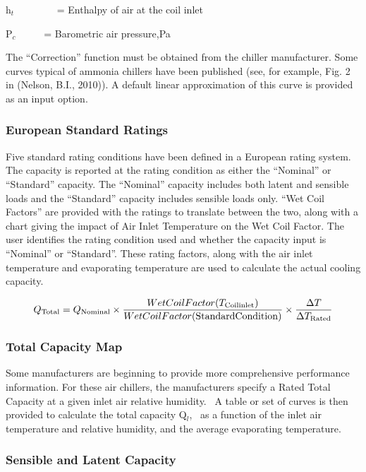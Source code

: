 h\(_{t}\)~~~~~~~~ = Enthalpy of air at the coil inlet

P\(_{c}\)~~~~~ = Barometric air pressure,Pa

The ``Correction'' function must be obtained from the chiller manufacturer. Some curves typical of ammonia chillers have been published (see, for example, Fig. 2 in (Nelson, B.I., 2010)). A default linear approximation of this curve is provided as an input option.

\subsubsection{European Standard Ratings}\label{european-standard-ratings}

Five standard rating conditions have been defined in a European rating system. The capacity is reported at the rating condition as either the ``Nominal'' or ``Standard'' capacity. The ``Nominal'' capacity includes both latent and sensible loads and the ``Standard'' capacity includes sensible loads only. ``Wet Coil Factors'' are provided with the ratings to translate between the two, along with a chart giving the impact of Air Inlet Temperature on the Wet Coil Factor. The user identifies the rating condition used and whether the capacity input is ``Nominal'' or ``Standard''. These rating factors, along with the air inlet temperature and evaporating temperature are used to calculate the actual cooling capacity.

\begin{equation}
{Q_{{\rm{Total}}}} = {Q_{{\rm{Nominal}}}} \times \frac{{WetCoilFactor({T_{{\rm{Coil inlet}}}})}}{{WetCoilFactor({\rm{Standard Condition}})}} \times \frac{{\Delta T}}{{\Delta {T_{{\rm{Rated}}}}}}
\end{equation}

\subsubsection{Total Capacity Map}\label{total-capacity-map}

Some manufacturers are beginning to provide more comprehensive performance information. For these air chillers, the manufacturers specify a Rated Total Capacity at a given inlet air relative humidity.~ A table or set of curves is then provided to calculate the total capacity Q\(_{l}\),~ as a function of the inlet air temperature and relative humidity, and the average evaporating temperature.

\subsubsection{Sensible and Latent Capacity}\label{sensible-and-latent-capacity}

